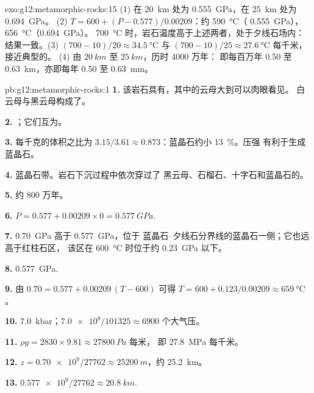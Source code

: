 \begin{solution}{exo:g12:metamorphic-rocks:15}
(1) 在 \qty{20}{km} 处为 \qty{0.555}{GPa}，在 \qty{25}{km} 处为 \qty{0.694}{GPa}。
(2) $T = 600 + (P - 0.577)/0.00209$：约 \qty{590}{\celsius}（
\qty{0.555}{GPa}），\qty{656}{\celsius}（\qty{0.694}{GPa}）。
\qty{700}{\celsius} 时，岩石温度高于上述两者，处于夕线石场内：
结果一致。(3) $(700 - 10)/20 \approx \qty{34.5}{\celsius}$ 与
$(700 - 10)/25 \approx \qty{27.6}{\celsius}$ 每千米，接近典型的。
(4) 由 $\qty{20}{km}$ 至 $\qty{25}{km}$，历时 4000 万年：
即每百万年 0.50 至 \qty{0.63}{km}，亦即每年 0.50 至
\qty{0.63}{mm}。
\end{solution}

\begin{solution}{pb:g12:metamorphic-rocks:1}
\textbf{1.} 该岩石具有，其中的云母大到可以肉眼看见。
白云母与黑云母构成了。

\textbf{2.} ；它们互为。

\textbf{3.} 每千克的体积之比为 $3.15/3.61 \approx
0.873$：蓝晶石约小 \qty{13}{\percent}。压强
有利于生成蓝晶石。

\textbf{4.} 蓝晶石带。岩石下沉过程中依次穿过了
黑云母、石榴石、十字石和蓝晶石的。

\textbf{5.} 约 800 万年。

\textbf{6.} $P = 0.577 + 0.00209 \times 0 = \qty{0.577}{GPa}$.

\textbf{7.} \qty{0.70}{GPa} 高于 \qty{0.577}{GPa}，位于
蓝晶石–夕线石分界线的蓝晶石一侧；它也远高于红柱石区，
该区在 \qty{600}{\celsius} 时位于约 \qty{0.23}{GPa} 以下。

\textbf{8.} \qty{0.577}{GPa}.

\textbf{9.} 由 $0.70 = 0.577 + 0.00209\,(T - 600)$ 可得 $T = 600 +
0.123/0.00209 \approx \qty{659}{\celsius}$。

\textbf{10.} \qty{7.0}{kbar}；$\num{7.0e8}/101325 \approx \num{6900}$
个大气压。

\textbf{11.} $\rho g = 2830 \times 9.81 \approx \qty{27800}{Pa}$ 每米，
即 \qty{27.8}{MPa} 每千米。

\textbf{12.} $z = \num{0.70e9}/\num{27762} \approx \qty{25200}{m}$，约
\qty{25.2}{km}。

\textbf{13.} $\num{0.577e9}/\num{27762} \approx \qty{20.8}{km}$.


\end{solution}
